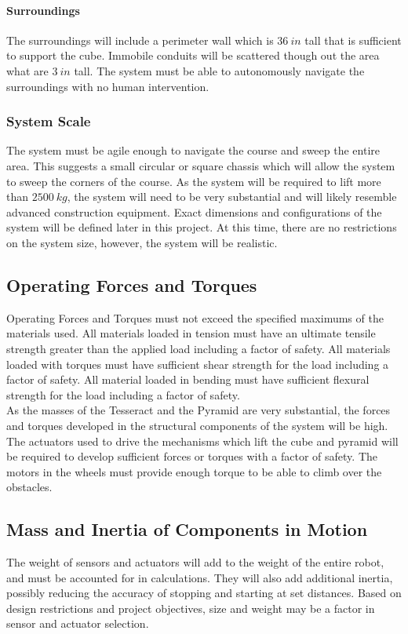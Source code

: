 \documentclass[12pt]{article}
\begin{document}
\paragraph{Surroundings} The surroundings will include a perimeter wall which is $36 \: in$ tall that is sufficient to support the cube. Immobile conduits will be scattered though out the area what are $3 \: in$ tall. The system must be able to autonomously navigate the surroundings with no human intervention.

\subsubsection{System Scale} 
The system must be agile enough to navigate the course and sweep the entire area. This suggests a small circular or square chassis which will allow the system to sweep the corners of the course. As the system will be required to lift more than $2500 \: kg$, the system will need to be very substantial and will likely resemble advanced construction equipment. Exact dimensions and configurations of the system will be defined later in this project. At this time, there are no restrictions on the system size, however, the system will be realistic.

\subsection{Operating Forces and Torques}
Operating Forces and Torques must not exceed the specified maximums of the materials used. All materials loaded in tension must have an ultimate tensile strength greater than the applied load including a factor of safety. All materials loaded with torques must have sufficient shear strength for the load including a factor of safety. All material loaded in bending must have sufficient flexural strength for the load including a factor of safety.\\

As the masses of the Tesseract and the Pyramid are very substantial, the forces and torques developed in the structural components of the system will be high. The actuators used to drive the mechanisms which lift the cube and pyramid will be required to develop sufficient forces or torques with a factor of safety. The motors in the wheels must provide enough torque to be able to climb over the obstacles. 

\subsection{Mass and Inertia of Components in Motion}
The weight of sensors and actuators will add to the weight of the entire robot, and must be accounted for in calculations. They will also add additional inertia, possibly reducing the accuracy of stopping and starting at set distances. Based on design restrictions and project objectives, size and weight may be a factor in sensor and actuator selection.
\end{document}
